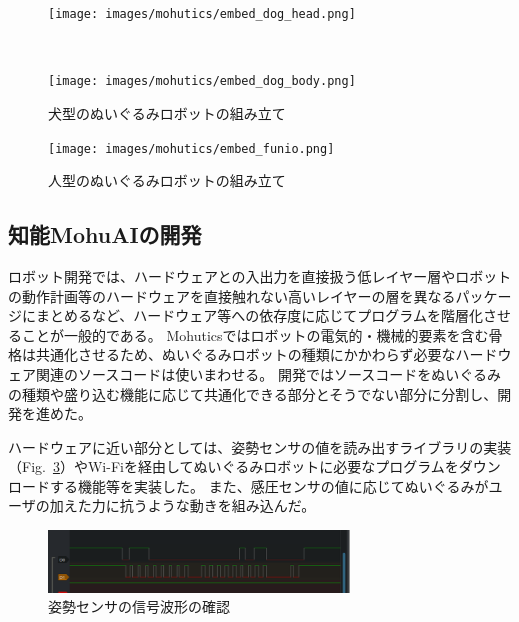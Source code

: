\documentclass[uplatex,a4paper,12pt]{jsarticle}
\renewcommand{\figurename}{Fig.}
\newcommand{\figref}[1]{\figurename~\ref{#1}}
\begin{document}
\begin{figure}[htbp]
  \centering
  \begin{minipage}[c]{\linewidth}
    \centering
    \texttt{[image: images/mohutics/embed\_dog\_head.png]}
  \end{minipage} \\
  \begin{minipage}[c]{\linewidth}
    \centering
    \texttt{[image: images/mohutics/embed\_dog\_body.png]}
  \end{minipage}
  \caption{犬型のぬいぐるみロボットの組み立て}
  \label{fig:mohutics:embed_dog}
\end{figure}

\begin{figure}[htbp]
  \centering
  \texttt{[image: images/mohutics/embed\_funio.png]}
  \caption{人型のぬいぐるみロボットの組み立て}
  \label{fig:mohutics:embed_funio}
\end{figure}

\subsection{知能MohuAIの開発}

ロボット開発では、ハードウェアとの入出力を直接扱う低レイヤー層やロボットの動作計画等のハードウェアを直接触れない高いレイヤーの層を異なるパッケージにまとめるなど、ハードウェア等への依存度に応じてプログラムを階層化させることが一般的である。
Mohuticsではロボットの電気的・機械的要素を含む骨格は共通化させるため、ぬいぐるみロボットの種類にかかわらず必要なハードウェア関連のソースコードは使いまわせる。
開発ではソースコードをぬいぐるみの種類や盛り込む機能に応じて共通化できる部分とそうでない部分に分割し、開発を進めた。

ハードウェアに近い部分としては、姿勢センサの値を読み出すライブラリの実装（\figref{fig:i2c_wave}）やWi-Fiを経由してぬいぐるみロボットに必要なプログラムをダウンロードする機能等を実装した。
また、感圧センサの値に応じてぬいぐるみがユーザの加えた力に抗うような動きを組み込んだ。

\begin{figure}[htbp]
  \centering
  \includegraphics[width=8cm]{images/mohutics/i2c_wave.png}
  \caption{姿勢センサの信号波形の確認}
  \label{fig:i2c_wave}
\end{figure}
\end{document}

